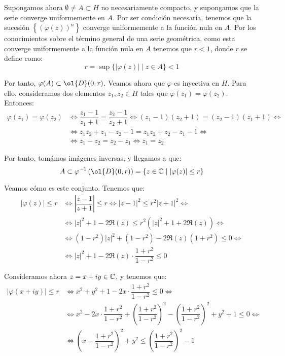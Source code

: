 \begin{ejercicio}
\begin{description}
                Supongamos ahora $\emptyset\neq A\subset H$ no necesariamente compacto, y supongamos que la serie converge uniformemente en $A$. Por ser condición necesaria, tenemos que la sucesión $\left\{(\varphi(z))^n\right\}$ converge uniformemente a la función nula en $A$. Por los conocimientos sobre el término general de una serie geométrica, como esta converge uniformemente a la función nula en $A$ tenemos que $r<1$, donde $r$ se define como:
                \begin{equation*}
                    r=\sup\{|\varphi(z)|\mid z\in A\}<1
                \end{equation*}

                Por tanto, $\varphi(A)\subset \ol{D}(0,r)$. Veamos ahora que $\varphi$ es inyectiva en $H$. Para ello, consideramos dos elementos $z_1,z_2\in H$ tales que $\varphi(z_1)=\varphi(z_2)$. Entonces:
                \begin{align*}
                    \varphi(z_1)=\varphi(z_2) &\iff 
                    \dfrac{z_1-1}{z_1+1} = \dfrac{z_2-1}{z_2+1}
                    \iff (z_1-1)(z_2+1) = (z_2-1)(z_1+1)
                    \iff\\&\iff  z_1z_2+z_1-z_2-1 = z_1z_2+z_2-z_1-1
                    \iff\\&\iff z_1-z_2 = z_2-z_1
                    \iff z_1 = z_2
                \end{align*}

                Por tanto, tomámos imágenes inversas, y llegamos a que:
                \begin{equation*}
                    A\subset \varphi^{-1}\left(\ol{D}(0,r)\right) = \left\{z\in \bb{C}\mid |\varphi(z)|\leq r\right\}
                \end{equation*}

                Veamos cómo es este conjunto. Tenemos que:
                \begin{align*}
                    |\varphi(z)|\leq r &\iff \left|\dfrac{z-1}{z+1}\right|\leq r
                    \iff |z-1|^2\leq r^2|z+1|^2
                    \iff\\&\iff |z|^2+1-2\Re(z)\leq r^2(|z|^2+1+2\Re(z))
                    \iff\\&\iff (1-r^2)|z|^2+(1-r^2)-2\Re(z)(1+r^2)\leq 0
                    \iff\\&\iff |z|^2+1-2\Re(z)\cdot \dfrac{1+r^2}{1-r^2}\leq 0
                \end{align*}

                Consideramos ahora $z=x+iy\in \mathbb{C}$, y tenemos que:
                \begin{align*}
                    |\varphi(x+iy)|\leq r &\iff x^2+y^2+1-2x\cdot \dfrac{1+r^2}{1-r^2}\leq 0
                    \iff\\&\iff x^2-2x\cdot \dfrac{1+r^2}{1-r^2} + \left(\dfrac{1+r^2}{1-r^2}\right)^2-\left(\dfrac{1+r^2}{1-r^2}\right)^2+y^2+1\leq 0
                    \iff\\&\iff \left(x-\dfrac{1+r^2}{1-r^2}\right)^2+y^2\leq \left(\dfrac{1+r^2}{1-r^2}\right)^2-1
                \end{align*}


\end{description}
\end{ejercicio}
